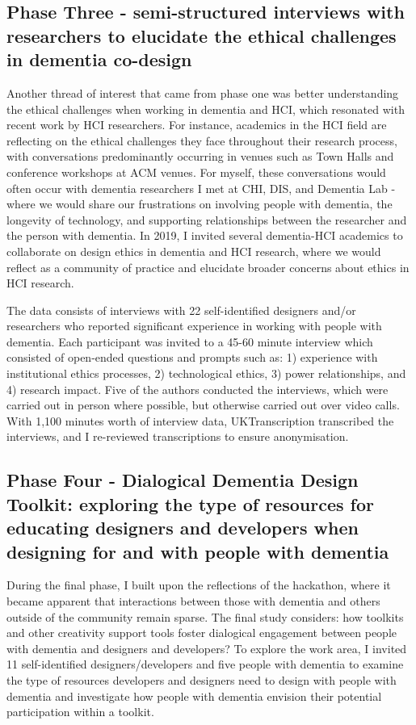 \subsection{Phase Three - semi-structured interviews with researchers to elucidate the ethical challenges in dementia co-design}

Another thread of interest that came from phase one was better understanding the ethical challenges when working in dementia and HCI, which resonated with recent work by HCI researchers. For instance, academics in the HCI field are reflecting on the ethical challenges they face throughout their research process, with conversations predominantly occurring in venues such as Town Halls and conference workshops at ACM venues. For myself, these conversations would often occur with dementia researchers I met at CHI, DIS, and Dementia Lab - where we would share our frustrations on involving people with dementia, the longevity of technology, and supporting relationships between the researcher and the person with dementia. In 2019, I invited several dementia-HCI academics to collaborate on design ethics in dementia and HCI research, where we would reflect as a community of practice and elucidate broader concerns about ethics in HCI research.

The data consists of interviews with 22 self-identified designers and/or researchers who reported significant experience in working with people with dementia. Each participant was invited to a 45-60 minute interview which consisted of open-ended questions and prompts such as: 1) experience with institutional ethics processes, 2) technological ethics,
3) power relationships, and 4) research impact. Five of the authors conducted the interviews, which were carried out in person where possible, but otherwise carried out over video calls. With 1,100 minutes worth of interview data, UKTranscription transcribed the interviews, and I re-reviewed transcriptions to ensure anonymisation.


\subsection{Phase Four - Dialogical Dementia Design Toolkit: exploring the type of resources for educating designers and developers when designing for and with people with dementia}

During the final phase, I built upon the reflections of the hackathon, where it became apparent that interactions between those with dementia and others outside of the community remain sparse. The final study considers: how toolkits and other creativity support tools foster dialogical engagement between people with dementia and designers and developers? To explore the work area, I invited 11 self-identified designers/developers and five people with dementia to examine the type of resources developers and designers need to design with people with dementia and investigate how people with dementia envision their potential participation within a toolkit.


